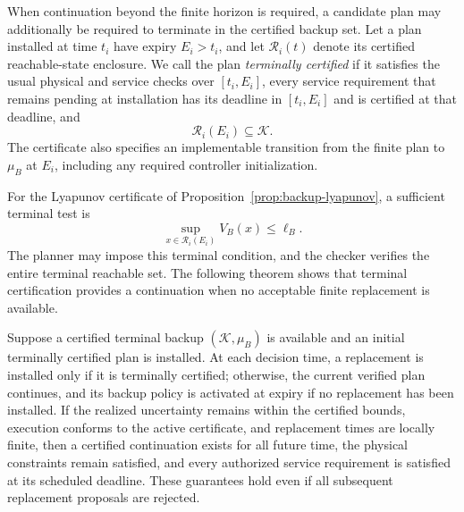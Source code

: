 When continuation beyond the finite horizon is required, a candidate plan may
additionally be required to terminate in the certified backup set. Let a plan
installed at time $t_i$ have expiry $E_i>t_i$, and let
$\mathcal R_i(t)$ denote its certified reachable-state enclosure. We call the
plan \emph{terminally certified} if it satisfies the usual physical and
service checks over $[t_i,E_i]$, every service requirement that remains pending at installation has its
deadline in $[t_i,E_i]$ and is certified at that deadline, and
\begin{equation}
\mathcal R_i(E_i)\subseteq\mathcal K.
\label{eq:backup-terminal-landing}
\end{equation}
The certificate also specifies an implementable transition from the finite
plan to $\mu_B$ at $E_i$, including any required controller initialization.

For the Lyapunov certificate of
Proposition~\ref{prop:backup-lyapunov}, a sufficient terminal test is
\begin{equation}
\sup_{x\in\mathcal R_i(E_i)}V_B(x)\le\ell_B.
\label{eq:backup-computable-landing}
\end{equation}
The planner may impose this terminal condition, and the checker verifies
the entire terminal reachable set. The following theorem shows that
terminal certification provides a continuation when no acceptable finite
replacement is available.

\begin{theorem}
\label{thm:backup-recursive-availability}
Suppose a certified terminal backup $(\mathcal K,\mu_B)$ is available and an
initial terminally certified plan is installed. At each decision time, a
replacement is installed only if it is terminally certified; otherwise, the
current verified plan continues, and its backup policy is activated at expiry
if no replacement has been installed. If the realized uncertainty remains
within the certified bounds, execution conforms to the active certificate, and
replacement times are locally finite, then a certified continuation exists
for all future time, the physical constraints remain satisfied, and every
authorized service requirement is satisfied at its scheduled deadline. These
guarantees hold even if all subsequent replacement proposals are rejected.
\end{theorem}


